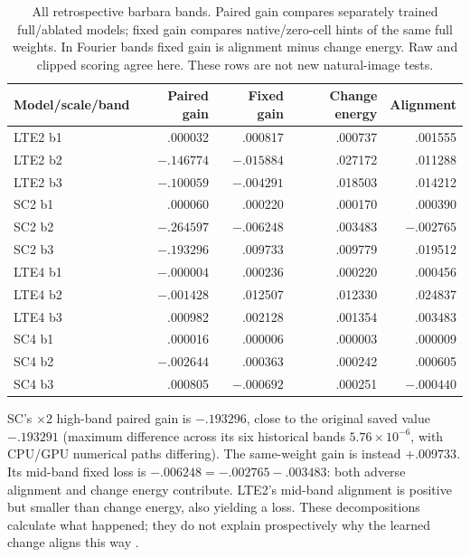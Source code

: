 \begin{table}[t]\centering\small
\caption{All retrospective barbara bands. Paired gain compares separately trained full/ablated models; fixed gain compares native/zero-cell hints of the same full weights. In Fourier bands fixed gain is alignment minus change energy. Raw and clipped scoring agree here. These rows are not new natural-image tests.}\label{tab:probe-natural}
\begin{tabular}{lrrrr}\toprule
Model/scale/band & Paired gain & Fixed gain & Change energy & Alignment\\\midrule
LTE2 b1 & .000032 & .000817 & .000737 & .001555\\
LTE2 b2 & $-.146774$ & $-.015884$ & .027172 & .011288\\
LTE2 b3 & $-.100059$ & $-.004291$ & .018503 & .014212\\
SC2 b1 & .000060 & .000220 & .000170 & .000390\\
SC2 b2 & $-.264597$ & $-.006248$ & .003483 & $-.002765$\\
SC2 b3 & $-.193296$ & .009733 & .009779 & .019512\\
LTE4 b1 & $-.000004$ & .000236 & .000220 & .000456\\
LTE4 b2 & $-.001428$ & .012507 & .012330 & .024837\\
LTE4 b3 & .000982 & .002128 & .001354 & .003483\\
SC4 b1 & .000016 & .000006 & .000003 & .000009\\
SC4 b2 & $-.002644$ & .000363 & .000242 & .000605\\
SC4 b3 & .000805 & $-.000692$ & .000251 & $-.000440$\\\bottomrule
\end{tabular}
\end{table}

SC's $\times 2$ high-band paired gain is $-.193296$, close to the original saved value $-.193291$ (maximum difference across its six historical bands $5.76\times 10^{-6}$, with CPU/GPU numerical paths differing). The same-weight gain is instead $+.009733$. Its mid-band fixed loss is $-.006248=-.002765-.003483$: both adverse alignment and change energy contribute. LTE2's mid-band alignment is positive but smaller than change energy, also yielding a loss. These decompositions calculate what happened; they do not explain prospectively why the learned change aligns this way .

